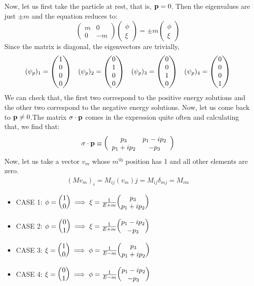  Now, let us first take the particle at rest, that is, $\vb{p}=0$. Then the eigenvalues are just $\pm m$ and the equation reduces to:
$$\begin{pmatrix}
    m & 0\\
    0 & -m
\end{pmatrix} \begin{pmatrix}
    \phi\\
    \xi
\end{pmatrix} = \pm m \begin{pmatrix}
    \phi\\
    \xi
\end{pmatrix}$$
Since the matrix is diagonal, the eigenvectors are trivially,
$$(\psi_p)_1 = \mqty(1\\ 0\\0\\0)\quad (\psi_p)_2 = \mqty(0\\ 1\\0\\0) \quad (\psi_p)_3 = \mqty(0\\ 0\\1\\0) \quad (\psi_p)_4= \mqty(0\\ 0\\0\\1)$$
We can check that, the first two correspond to the positive energy solutions and the other two correspond to the negative energy solutions. Now, let us come back to $\vb{p}\neq 0$.The matrix $\sigma\cdot \vb{p}$ comes in the expression quite often and calculating that, we find that:
$$\sigma\cdot \vb{p} \equiv \left(
\begin{array}{cc}
 p_3 & p_1-i p_2 \\
 p_1+i p_2 & -p_3 \\
\end{array}
\right)$$
Now, let us take a vector $v_m$ whose $m^{\mathrm{th}}$ position has 1 and all other elements are zero. 
\begin{align*}
    (Mv_m)_i = M_{ij}(v_m)j = M_{ij}\delta_{mj} = M_{im}
\end{align*}
\begin{itemize}
    \item CASE 1: $\phi = \mqty(1\\0)\implies \xi = \frac{1}{E+m}\mqty(p_3\\ p_1+ip_2)$
    \item CASE 2: $\phi = \mqty(0\\1)\implies \xi = \frac{1}{E+m}\mqty(p_1 - i p_2\\ -p_3)$
    \item CASE 3: $\xi = \mqty(1\\0)\implies \phi= \frac{1}{E-m}\mqty(p_3\\ p_1+ip_2)$
    \item CASE 4: $\xi = \mqty(0\\1)\implies \phi= \frac{1}{E-m}\mqty(p_1 - i p_2\\ -p_3)$
\end{itemize}

